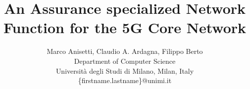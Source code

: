 \documentclass[10pt]{scrartcl}
\begin{document}
\title{An Assurance specialized Network Function for the 5G Core Network}
\author{
	Marco Anisetti, Claudio A. Ardagna, Filippo Berto \\
	Department of Computer Science \\ Università degli Studi di Milano, Milan, Italy \\ \{firstname.lastname\}@unimi.it
}
\date{}
\maketitle
\thispagestyle{empty} %




% 


\end{document}
